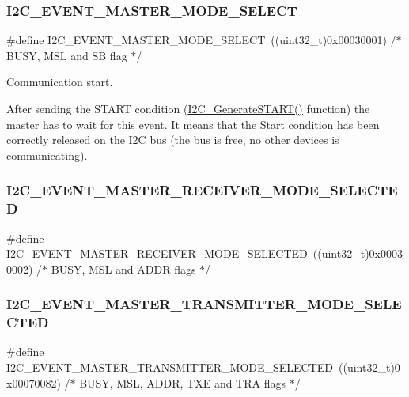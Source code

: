 \subsubsection{\texorpdfstring{I2C\_EVENT\_MASTER\_MODE\_SELECT}{I2C\_EVENT\_MASTER\_MODE\_SELECT}}
{\footnotesize\ttfamily \#define I2\+C\+\_\+\+E\+V\+E\+N\+T\+\_\+\+M\+A\+S\+T\+E\+R\+\_\+\+M\+O\+D\+E\+\_\+\+S\+E\+L\+E\+CT~((uint32\+\_\+t)0x00030001)  /$\ast$ B\+U\+S\+Y, M\+S\+L and S\+B flag $\ast$/}



Communication start. 

After sending the S\+T\+A\+RT condition (\mbox{\hyperlink{group___i2_c___exported___functions_ga36c522b471588be9779c878222ccb20f}{I2\+C\+\_\+\+Generate\+S\+T\+A\+R\+T()}} function) the master has to wait for this event. It means that the Start condition has been correctly released on the I2C bus (the bus is free, no other devices is communicating). \mbox{\label{group___i2_c___events_gabfde82864432ddb87b6462234d542e60}} 
\subsubsection{\texorpdfstring{I2C\_EVENT\_MASTER\_RECEIVER\_MODE\_SELECTED}{I2C\_EVENT\_MASTER\_RECEIVER\_MODE\_SELECTED}}
{\footnotesize\ttfamily \#define I2\+C\+\_\+\+E\+V\+E\+N\+T\+\_\+\+M\+A\+S\+T\+E\+R\+\_\+\+R\+E\+C\+E\+I\+V\+E\+R\+\_\+\+M\+O\+D\+E\+\_\+\+S\+E\+L\+E\+C\+T\+ED~((uint32\+\_\+t)0x00030002)  /$\ast$ B\+U\+S\+Y, M\+S\+L and A\+D\+D\+R flags $\ast$/}

\mbox{\label{group___i2_c___events_ga2361a6e60b7dc86fb682dd06fbd3edb7}} 
\subsubsection{\texorpdfstring{I2C\_EVENT\_MASTER\_TRANSMITTER\_MODE\_SELECTED}{I2C\_EVENT\_MASTER\_TRANSMITTER\_MODE\_SELECTED}}
{\footnotesize\ttfamily \#define I2\+C\+\_\+\+E\+V\+E\+N\+T\+\_\+\+M\+A\+S\+T\+E\+R\+\_\+\+T\+R\+A\+N\+S\+M\+I\+T\+T\+E\+R\+\_\+\+M\+O\+D\+E\+\_\+\+S\+E\+L\+E\+C\+T\+ED~((uint32\+\_\+t)0x00070082)  /$\ast$ B\+U\+S\+Y, M\+S\+L, A\+D\+D\+R, T\+X\+E and T\+R\+A flags $\ast$/}



